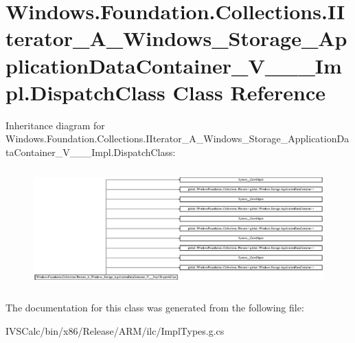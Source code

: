 \hypertarget{class_windows_1_1_foundation_1_1_collections_1_1_i_iterator___a___windows___storage___applicatio99ea31682e5586f924e177cef58863e0}{}\section{Windows.\+Foundation.\+Collections.\+I\+Iterator\+\_\+\+A\+\_\+\+Windows\+\_\+\+Storage\+\_\+\+Application\+Data\+Container\+\_\+\+V\+\_\+\+\_\+\+\_\+\+Impl.\+Dispatch\+Class Class Reference}
\label{class_windows_1_1_foundation_1_1_collections_1_1_i_iterator___a___windows___storage___applicatio99ea31682e5586f924e177cef58863e0}
Inheritance diagram for Windows.\+Foundation.\+Collections.\+I\+Iterator\+\_\+\+A\+\_\+\+Windows\+\_\+\+Storage\+\_\+\+Application\+Data\+Container\+\_\+\+V\+\_\+\+\_\+\+\_\+\+Impl.\+Dispatch\+Class\+:\begin{figure}[H]
\begin{center}
\leavevmode
\includegraphics[height=4.610778cm]{class_windows_1_1_foundation_1_1_collections_1_1_i_iterator___a___windows___storage___applicatio99ea31682e5586f924e177cef58863e0}
\end{center}
\end{figure}


The documentation for this class was generated from the following file\+:\begin{DoxyCompactItemize}
\item 
I\+V\+S\+Calc/bin/x86/\+Release/\+A\+R\+M/ilc/Impl\+Types.\+g.\+cs\end{DoxyCompactItemize}

